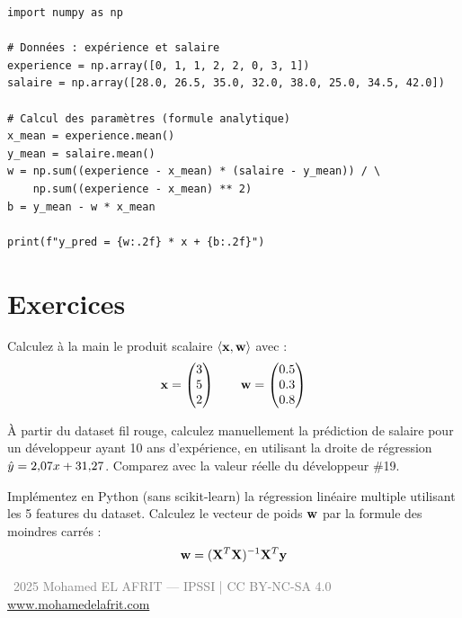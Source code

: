\begin{pythonbox}
\begin{lstlisting}
import numpy as np

# Données : expérience et salaire
experience = np.array([0, 1, 1, 2, 2, 0, 3, 1])
salaire = np.array([28.0, 26.5, 35.0, 32.0, 38.0, 25.0, 34.5, 42.0])

# Calcul des paramètres (formule analytique)
x_mean = experience.mean()
y_mean = salaire.mean()
w = np.sum((experience - x_mean) * (salaire - y_mean)) / \
    np.sum((experience - x_mean) ** 2)
b = y_mean - w * x_mean

print(f"y_pred = {w:.2f} * x + {b:.2f}")
\end{lstlisting}
\end{pythonbox}

\section{Exercices}

\exercice{\exofondamental}

Calculez à la main le produit scalaire $\langle \mathbf{x}, \mathbf{w} \rangle$ avec :
\[
    \mathbf{x} = \begin{pmatrix} 3 \\ 5 \\ 2 \end{pmatrix}
    \qquad
    \mathbf{w} = \begin{pmatrix} 0.5 \\ 0.3 \\ 0.8 \end{pmatrix}
\]

\exercice{\exointermediaire}

À partir du dataset fil rouge, calculez manuellement la prédiction de salaire pour un développeur ayant 10 ans d'expérience, en utilisant la droite de régression $\hat{y} = 2{,}07x + 31{,}27$. Comparez avec la valeur réelle du développeur \#19.

\exercice{\exoavance}

Implémentez en Python (sans scikit-learn) la régression linéaire multiple utilisant les 5 features du dataset. Calculez le vecteur de poids $\mathbf{w}$ par la formule des moindres carrés :
\[
    \mathbf{w} = (\mathbf{X}^T \mathbf{X})^{-1} \mathbf{X}^T \mathbf{y}
\]

\separateur

\begin{center}
    \small\sffamily\textcolor{gray}{%
        \textcopyright\ 2025 Mohamed EL AFRIT — IPSSI | CC BY-NC-SA 4.0\\
        \url{www.mohamedelafrit.com}
    }
\end{center}


